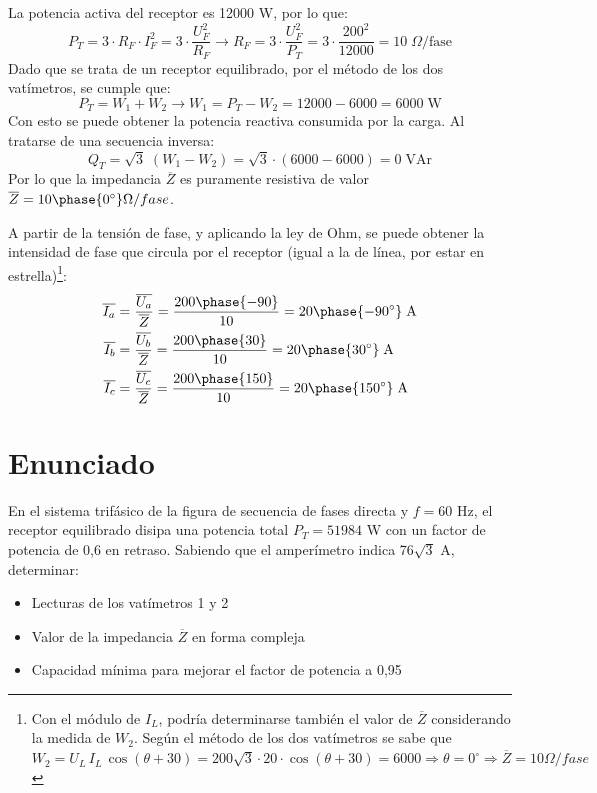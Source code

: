 La potencia activa del receptor es 12000 W, por lo que:
\begin{equation*}
    P_T=3\cdot R_F\cdot I_F^2=3\cdot \dfrac{U_F^2}{R_F}\rightarrow R_F=3\cdot\dfrac{U_F^2}{P_T}=3\cdot \dfrac{200^2}{12000}=10\;\Omega\text{/fase}
\end{equation*}
Dado que se trata de un receptor equilibrado, por el método de los dos vatímetros, se cumple que:
\begin{equation*}
    P_T=W_1+W_2\rightarrow W_1=P_T-W_2=12000-6000=6000\;\text{W}
\end{equation*}
Con esto se puede obtener la potencia reactiva consumida por la carga. Al tratarse de una secuencia inversa:
\begin{equation*}
    Q_T=\sqrt{3}\; (W_1-W_2)=\sqrt{3}\cdot (6000-6000)=0\;\text{VAr}
\end{equation*}
Por lo que la impedancia $\overline{Z}$ es puramente resistiva de valor $\overline{Z}=10\phase{0^\circ}\Omega/fase$.

A partir de la tensión de fase, y aplicando la ley de Ohm, se puede obtener la intensidad de fase que circula por el receptor (igual a la de línea, por estar en estrella)\footnote{Con el módulo de $I_L$, podría determinarse también el valor de $\overline{Z}$ considerando la medida de $W_2$. Según el método de los dos vatímetros se sabe que $W_2=U_L\,I_L\,\cos(\theta+30)=200\sqrt{3}\cdot 20\cdot \cos(\theta+30)=6000\Rightarrow \theta = 0^\circ\Rightarrow\overline{Z}=10\Omega/fase$}:
\begin{align*}
    \overline{I_a}&=\dfrac{\overline{U_{a}}}{\overline{Z}}=\dfrac{200\phase{-90}}{10}={20\phase{-90^\circ}\;\text{A}}\\
    \overline{I_b}&=\dfrac{\overline{U_{b}}}{\overline{Z}}=\dfrac{200\phase{30}}{10}={20\phase{30^\circ}\;\text{A}}\\
    \overline{I_c}&=\dfrac{\overline{U_{c}}}{\overline{Z}}=\dfrac{200\phase{150}}{10}={20\phase{150^\circ}\;\text{A}}
\end{align*}




 \section{Enunciado}
 
En el sistema trifásico de la figura de secuencia de fases directa y $f=60$ Hz, el receptor equilibrado disipa una potencia total $P_T =51984$ W con un factor de potencia de 0,6 en
retraso. Sabiendo que el amperímetro indica 76$\sqrt{3}$ A,
determinar:
\begin{itemize}
    \item  Lecturas de los vatímetros 1 y 2
    \item  Valor de la impedancia $\overline{Z}$ en forma compleja
    \item Capacidad mínima para mejorar el factor de potencia a 0,95
\end{itemize}

